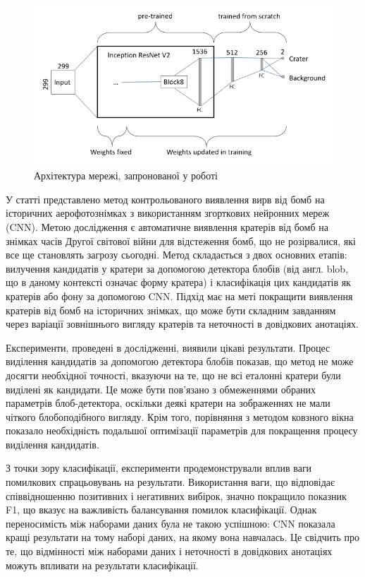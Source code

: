 \begin{figure}[ht]
      \centering
      \includegraphics[scale=0.75]{Images/paper_arch.png}
      \caption{Архітектура мережі, запронованої у роботі~\cite{clermont2019}}
      \label{cnn_paper_arch}
\end{figure}

У статті представлено метод контрольованого виявлення вирв
від бомб на історичних аерофотознімках з використанням
згорткових нейронних мереж (CNN). Метою дослідження є
автоматичне виявлення кратерів від бомб на знімках часів
Другої світової війни для відстеження бомб, що не розірвалися,
які все ще становлять загрозу сьогодні. Метод складається з
двох основних етапів: вилучення кандидатів у кратери за
допомогою детектора блобів (від англ. blob, що в даному контексті
означає форму кратера) і класифікація цих кандидатів
як кратерів або фону за допомогою CNN. Підхід має
на меті покращити виявлення кратерів від бомб на
історичних знімках, що може бути складним завданням
через варіації зовнішнього вигляду кратерів та неточності
в довідкових анотаціях.

Експерименти, проведені в дослідженні, виявили цікаві
результати. Процес виділення кандидатів за допомогою
детектора блобів показав, що метод не може досягти необхідної
точності, вказуючи на те, що не всі еталонні кратери
були виділені як кандидати. Це може бути пов'язано з
обмеженнями обраних параметрів блоб-детектора, оскільки
деякі кратери на зображеннях не мали чіткого блобоподібного
вигляду. Крім того, порівняння з методом ковзного вікна
показало необхідність подальшої оптимізації параметрів
для покращення процесу виділення кандидатів.

З точки зору класифікації, експерименти продемонстрували
вплив ваги помилкових спрацьовувань на результати.
Використання ваги, що відповідає співвідношенню позитивних
і негативних вибірок, значно покращило показник F1,
що вказує на важливість балансування помилок класифікації.
Однак переносимість між наборами даних була не такою успішною:
CNN показала кращі результати на тому наборі даних,
на якому вона навчалась. Це свідчить про те,
що відмінності між наборами даних і неточності
в довідкових анотаціях можуть впливати на результати класифікації.

